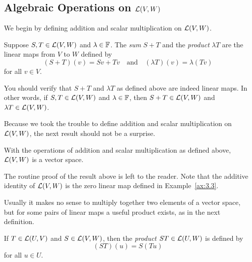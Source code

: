 \subsection{\texorpdfstring{Algebraic Operations on $\mathcal{L}(V,W)$}{Algebraic
Operations on L(V,W)}}

We begin by defining addition and scalar multiplication on $\mathcal{L}(V,W)$.

\begin{definition}\label{ax:3.5}
Suppose $S,T\in\mathcal{L}(V,W)$ and $\lambda\in\mathbb{F}$. The \emph{sum} $S+T$ and the
\emph{product} $\lambda T$ are the linear maps from $V$ to $W$ defined by
\[ (S+T)(v)=Sv+Tv \quad\text{and}\quad (\lambda T)(v)=\lambda(Tv) \]
for all $v\in V$.
\end{definition}

%
You should verify that $S+T$ and $\lambda T$ as defined above are indeed linear
maps. In other words, if $S,T\in\mathcal{L}(V,W)$ and $\lambda\in\mathbb{F}$, then
$S+T\in\mathcal{L}(V,W)$ and $\lambda T\in\mathcal{L}(V,W)$.

Because we took the trouble to define addition and scalar multiplication on
$\mathcal{L}(V,W)$, the next result should not be a surprise.

\begin{result}\label{ax:3.6}
With the operations of addition and scalar multiplication as defined above,
$\mathcal{L}(V,W)$ is a vector space.
\end{result}

The routine proof of the result above is left to the reader. Note that the
additive identity of $\mathcal{L}(V,W)$ is the zero linear map defined in
Example~\ref{ax:3.3}.

Usually it makes no sense to multiply together two elements of a vector space,
but for some pairs of linear maps a useful product exists, as in the next
definition.

\begin{definition}\label{ax:3.7}
If $T\in\mathcal{L}(U,V)$ and $S\in\mathcal{L}(V,W)$, then the \emph{product}
$ST\in\mathcal{L}(U,W)$ is defined by
\[ (ST)(u)=S(Tu) \]
for all $u\in U$.
\end{definition}

